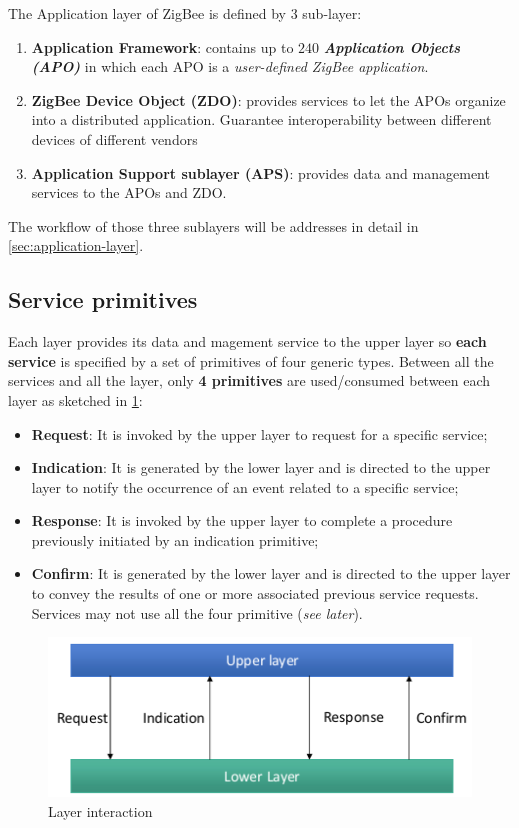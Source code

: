 \documentclass[10pt,a4paper]{report}
\theoremstyle{definition}
\begin{document}
The Application layer of ZigBee is defined by 3 sub-layer:
\begin{enumerate}
	\item 
	\textbf{Application Framework}: contains up to $240$ \textbf{\textit{Application Objects (APO)}} in which each APO is a \textit{user-defined ZigBee application}.
	\item 
	\textbf{ZigBee Device Object (ZDO)}: provides services to let the APOs organize into a distributed application. Guarantee interoperability between different devices of different vendors
	\item 
	\textbf{Application Support sublayer (APS)}: provides data and management services to the APOs and ZDO.
\end{enumerate}
The workflow of those three sublayers will be addresses in detail in \ref{sec:application-layer}.
\subsection{Service primitives}\label{sec:service-primitives}
Each layer provides its data and magement service to the upper layer so \textbf{each service} is specified by a set of primitives of four generic types.
Between all the services and all the layer, only \textbf{4 primitives} are used/consumed between each layer as sketched in \ref{4-primitives-layer}:
\begin{itemize}
	\item 
	\textbf{Request}: It is invoked by the upper layer to request for a specific service;
	\item 
	\textbf{Indication}: It is generated by the lower layer and is directed to the upper layer to notify the occurrence of an event related to a specific service;
	\item 
	\textbf{Response}: It is invoked by the upper layer to complete a procedure previously initiated by an indication primitive;
	\item 
	\textbf{Confirm}: It is generated by the lower layer and is directed to the upper layer to convey the results of one or more associated previous service requests.
	Services may not use all the four primitive (\textit{see later}).

\end{itemize}
	\begin{figure}[h]
	\centering\includegraphics[scale=0.50]{images/Pasted image 20230307163527.png}
	\caption{Layer interaction}
	\label{4-primitives-layer}
\end{figure}
\end{document}
